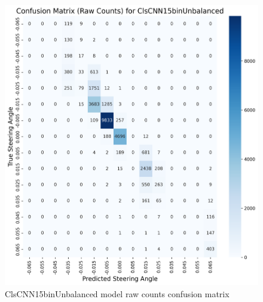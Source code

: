 \begin{figure}[H]
\centering
\includegraphics[width=1\linewidth]{Figures/Results/cm_raw_ClsCNN15binUnbalanced.png}
\caption{ClsCNN15binUnbalanced model raw counts confusion matrix}
\label{fig:cm_raw_ClsCNN15binUnbalanced}
\end{figure}


